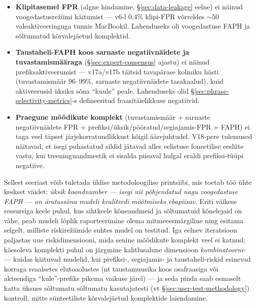 \begin{itemize}
    \item \textbf{Klipitasemel FPR} (algne hindamine, §\ref{sec:data-leakage} eelne) ei näinud voogedastusrežiimi käitumist --- v6-l 0,4\% klipi-FPR võrreldes ${\sim}50$ valeaktiveeringuga tunnis MacBookil. Lahenduseks oli voogedastuse FAPH ja sõltumatud kõrvalejäetud komplektid.
    \item \textbf{Taustaheli-FAPH koos sarnaste negatiivnäidete ja tuvastamismääraga} (§\ref{sec:expert-consensus} ajastu) ei näinud prefiksaktiveerumist --- v17a/v17b täitsid tavapärase kolmiku hästi (tuvastamismäär 96--99\%, sarnaste negatiivnäidete tasakaalud), kuid aktiveerusid üksiku sõna \enquote{kuule} peale. Lahenduseks olid §\ref{sec:phrase-selectivity-metrics}-s defineeritud fraasitäielikkuse negatiivid.
    \item \textbf{Praegune mõõdikute komplekt} (tuvastamismäär + sarnaste negatiivnäidete FPR + prefiksi/üksik/pööratud/segiajamis-FPR + FAPH) ei taga veel täpset järjekorratundlikkust kõigil äärejuhtudel. V18-pere tulemused näitavad, et isegi puhastatud sildid jätavad alles eelistuse foneetilise eesliite vastu, kui treeninguandmestik ei sisalda piisaval hulgal eraldi prefiksi-tüüpi negatiive.
\end{itemize}

Sellest seeriast võib tuletada üldise metodoloogilise printsiibi, mis toetab töö ühte keskset väidet: \emph{üksik koondnumber --- isegi nii põhjendatud nagu voogedastuse FAPH --- on äratussõna mudeli kvaliteedi mõõtmiseks ebapiisav}. Eriti väikese ressursiga keele puhul, kus sihtkeele kõneandmeid ja sõltumatuid kõnelejaid on vähe, peab mudeli lõplik raporteerimine olema mitmeeesmärgiline ning esitama selgelt, milliste riskirežiimide suhtes mudel on testitud. Iga eelnev iteratsioon paljastas uue riskidimensiooni, mida senine mõõdikute komplekt veel ei katnud; käesoleva komplekti puhul on järgmine kahtlusalune dimensioon \emph{kombinatoorne} --- kuidas käituvad mudelid, kui prefiksi-, segiajamis- ja taustaheli-riskid esinevad korraga reaalsetes elutoaolustes (nt taustamuusika koos osafraasiga või aktsendiga \enquote{kule}-prefiks pikema vaikuse järel) --- ja seda pinda saab esmaselt katta üksnes sõltumatu sõltumatu kasutajatesti (vt §\ref{sec:user-test-methodology}) kontroll, mitte sünteetiliste kõrvalejäetud komplektide laiendamine.


